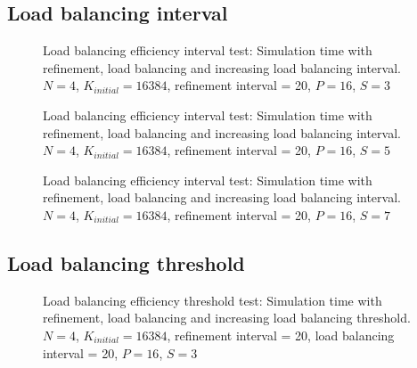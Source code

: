 
\subsection{Load balancing interval}\label{subsection:results:load_balancing_performance:interval}

\begin{figure}[H]
	\centering
	
	\caption{Load balancing efficiency interval test: Simulation time with refinement, load balancing and increasing load balancing interval. \(N = 4\), \(K_{initial} = 16384\), refinement interval = 20, \(P = 16\), \(S = 3\)}\label{fig:load_balancing_efficiency_interval}
\end{figure}

\begin{figure}[H]
	\centering
	
	\caption{Load balancing efficiency interval test: Simulation time with refinement, load balancing and increasing load balancing interval. \(N = 4\), \(K_{initial} = 16384\), refinement interval = 20, \(P = 16\), \(S = 5\)}\label{fig:load_balancing_efficiency_interval_s5}
\end{figure}

\begin{figure}[H]
	\centering
	
	\caption{Load balancing efficiency interval test: Simulation time with refinement, load balancing and increasing load balancing interval. \(N = 4\), \(K_{initial} = 16384\), refinement interval = 20, \(P = 16\), \(S = 7\)}\label{fig:load_balancing_efficiency_interval_s7}
\end{figure}


\subsection{Load balancing threshold}\label{subsection:results:load_balancing_performance:threshold}

\begin{figure}[H]
	\centering
	
	\caption{Load balancing efficiency threshold test: Simulation time with refinement, load balancing and increasing load balancing threshold. \(N = 4\), \(K_{initial} = 16384\), refinement interval = 20, load balancing interval = 20, \(P = 16\), \(S = 3\)}\label{fig:load_balancing_efficiency_threshold_s3}
\end{figure}

